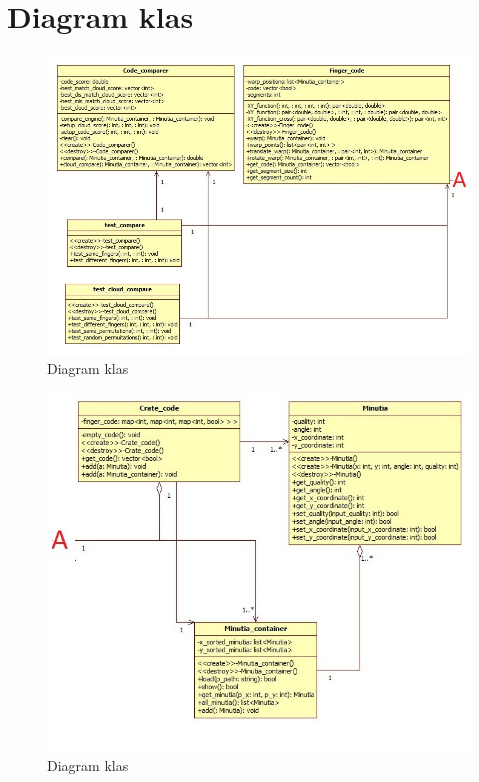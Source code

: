 \section {Diagram klas}
\begin{figure}[!hb]
    \begin{center}
		\includegraphics[angle=90,scale=.9]{img/UML_diagram_1.jpg}
		\caption{Diagram klas}
		\label{img:UML}
    \end{center}
\end{figure}
\newpage 
\begin{figure}[!hb]
    \begin{center}
		\includegraphics[angle=90,scale=.9]{img/UML_diagram_2.jpg}
		\caption{Diagram klas}
		\label{img:UML}
	\end{center}
\end{figure}

